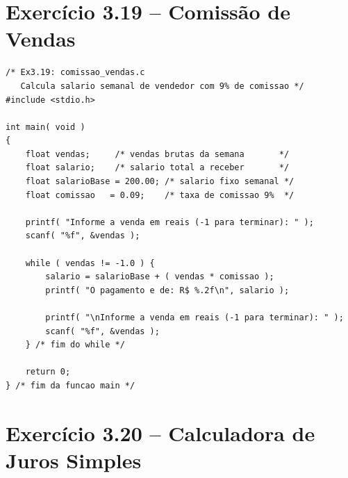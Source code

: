\documentclass[12pt,a4paper]{article}
\begin{document}
\section{Exercício 3.19 -- Comissão de Vendas}

\begin{respostabox}
\begin{lstlisting}
/* Ex3.19: comissao_vendas.c
   Calcula salario semanal de vendedor com 9% de comissao */
#include <stdio.h>

int main( void )
{
    float vendas;     /* vendas brutas da semana       */
    float salario;    /* salario total a receber       */
    float salarioBase = 200.00; /* salario fixo semanal */
    float comissao   = 0.09;    /* taxa de comissao 9%  */

    printf( "Informe a venda em reais (-1 para terminar): " );
    scanf( "%f", &vendas );

    while ( vendas != -1.0 ) {
        salario = salarioBase + ( vendas * comissao );
        printf( "O pagamento e de: R$ %.2f\n", salario );

        printf( "\nInforme a venda em reais (-1 para terminar): " );
        scanf( "%f", &vendas );
    } /* fim do while */

    return 0;
} /* fim da funcao main */
\end{lstlisting}
\end{respostabox}

\section{Exercício 3.20 -- Calculadora de Juros Simples}
\end{document}

